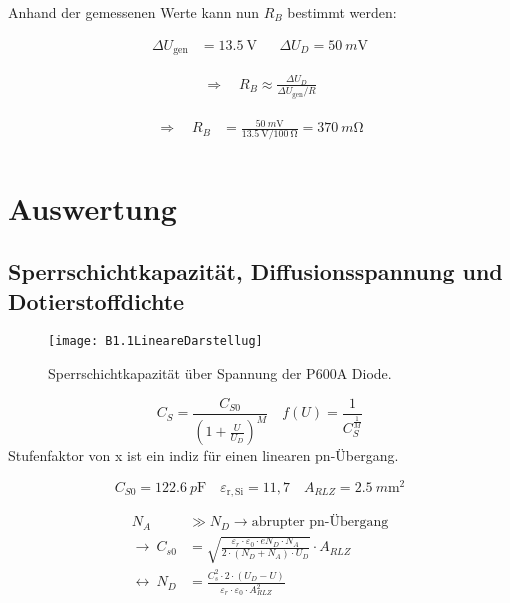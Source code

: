 \documentclass[
	a4paper, %
	12pt, %
]{CSUniSchoolLabReport}
\newcommand{\pico}{p}
\newcommand{\milli}{m}
\begin{document}
Anhand der gemessenen Werte kann nun $R_B$ bestimmt werden:

\begin{align*}
    \Delta U_{\text{gen}} &= \SI{13.5}{\volt} 
    && \Delta U_D = \SI{50}{\milli\volt}
\end{align*}

\begin{align*}
    \Rightarrow\quad 
    R_B \approx \frac{\Delta U_D}{\Delta U_{\text{gen}} / R}
\end{align*}

\begin{align*}
    \Rightarrow\quad 
    R_B &= \frac{\SI{50}{\milli\volt}}{\SI{13.5}{\volt} / \SI{100}\ohm}  =  \SI{370}{\milli\ohm} \\
\end{align*}

\vspace{1em}


\section{Auswertung}

\subsection{Sperrschichtkapazität, Diffusionsspannung und \\Dotierstoffdichte}

\begin{figure}[H] %
	\centering %
	\texttt{[image: B1.1LineareDarstellug]} %
	\caption{Sperrschichtkapazität über Spannung der P600A Diode.}
\end{figure}


\[
C_S = \frac{C_{S0}}{(1+\frac{U}{U_D})^M}\quad f(U) = \frac{1}{C_S^\frac{1}{M}}
\]
Stufenfaktor von x ist ein indiz für einen linearen pn-Übergang.

\vspace{1em} 


\[
C_{S0} = \SI{122,6}{\pico\farad} \quad \varepsilon_{\mathrm{r,Si}} = 11{,}7 \quad A_{RLZ} = \SI{2.5}{\milli\metre\squared}
\]

\begin{align*}
N_A &\gg N_D \rightarrow \text{abrupter pn-Übergang} \\
\rightarrow\ C_{s0} &= \sqrt{\frac{\varepsilon_r \cdot \varepsilon_0 \cdot e N_D \cdot N_A}{2 \cdot (N_D + N_A) \cdot U_D}} \cdot A_{RLZ} \\
\leftrightarrow\ N_D &= \frac{C_s^2 \cdot 2 \cdot (U_D - U)}{\varepsilon_r \cdot \varepsilon_0 \cdot A_{RLZ}^2}
\end{align*}
\end{document}
